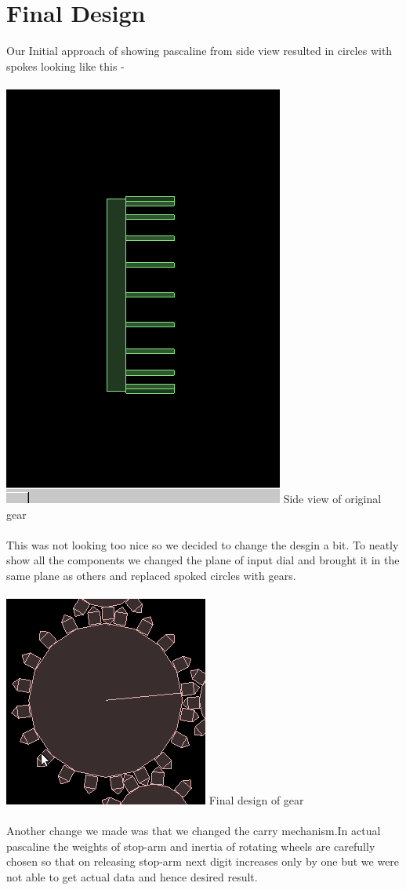\documentclass[11pt]{article}
\begin{document}
\section{Final Design}
Our Initial approach of showing pascaline from side view resulted in circles with spokes looking like this -
\\
\\
\includegraphics[scale=0.25]{../images/OriginalGear.png} 
Side view of original gear
\\
\\
This was not looking too nice so we decided to change the desgin    a bit.
To neatly show all the components we changed the plane of input dial and brought it in the same plane as others and replaced spoked circles with gears.
\\
\\
\includegraphics[scale=0.5]{../images/Gear.png} 
Final design of gear
\\
\\
Another change we made was that we changed the carry mechanism.In actual pascaline the weights of stop-arm and inertia of rotating wheels are carefully chosen so that on releasing stop-arm next digit increases only by one but we were not able to get actual data and hence desired result.
\end{document}
